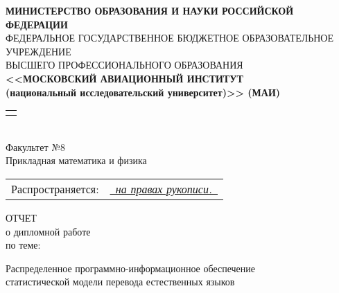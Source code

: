 
\begin{titlepage}

\newcommand{\byhand}[1]{\underline{\it \color{blue} \ #1\ }}

{\small\begin{center}
		{\bfseries
			МИНИСТЕРСТВО ОБРАЗОВАНИЯ И НАУКИ РОССИЙСКОЙ ФЕДЕРАЦИИ
		} \\
		{ \footnotesize
			ФЕДЕРАЛЬНОЕ ГОСУДАРСТВЕННОЕ БЮДЖЕТНОЕ ОБРАЗОВАТЕЛЬНОЕ УЧРЕЖДЕНИЕ \\
					ВЫСШЕГО ПРОФЕССИОНАЛЬНОГО ОБРАЗОВАНИЯ \\
		}
		{\bfseries
			<<МОСКОВСКИЙ АВИАЦИОННЫЙ ИНСТИТУТ \\	
			(национальный исследовательский университет)>> (МАИ)\\
		}
		\begin{tabular}{p{13cm}}
			\hline \\
		\end{tabular}\\
		{Факультет №8\\
			{ \footnotesize  Прикладная математика и физика }
		}
\end{center}}

\vspace{12pt}

{ \small \begin{flushright}
		\begin{tabular}{rl}
			Распространяется: & \byhand{на правах рукописи.} \\
		\end{tabular}
\end{flushright}}

\vspace{24pt}
	
\begin{center}
	\sffamily
	{\Large
		{ \LARGE
			ОТЧЕТ \\
		}
		о дипломной работе \\
	}	
	по теме: \\	
	\vspace{24pt}
	{ \large
		\begin{onehalfspacing}
			Распределенное программно-информационное обеспечение \\
			статистической модели перевода естественных языков
		\end{onehalfspacing}
	}
\end{center}


\end{titlepage}
